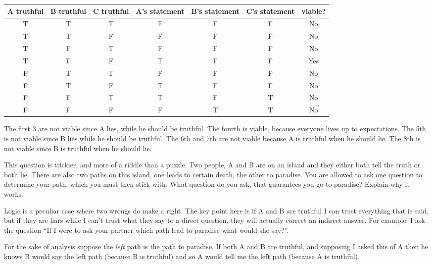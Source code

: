 \documentclass[addpoints, answers]{exam}
\begin{document}
\begin{questions}
\begin{solution}
  {\small
    \begin{tabular}[h]{c@{\,}|c@{\,}|c@{\,}|c@{\,}|c@{\,}|c@{\,}|c@{\,}}
      A truthful & B truthful & C truthful & A's statement & B's statement & C's
      statement & viable?\\
      \hline
      T & T & T & F & F & F & No\\
      T & T & F & F & F & F & No\\
      T & F & T & F & F & F & No\\
      T & F & F & T & F & F & Yes\\
      F & T & T & F & F & F & No\\
      F & T & F & T & F & F & No\\
      F & F & T & T & F & T & No\\
      F & F & F & F & T & T & No\\
    \end{tabular}
  }
  
  The first 3 are not viable since A lies, while he should be truthful. The
  fourth is viable, because everyone lives up to expectations. The 5th is not
  viable since B lies while he should be truthful. The 6th and 7th are not
  viable because A is truthful when he should lie. The 8th is not viable since B
  is truthful when he should lie.
  \end{solution}

  \bonusquestion[5] This question is trickier, and more of a riddle than a
  puzzle. Two people, A and B are on an island and they either both tell the
  truth or both lie. There are also two paths on this island, one leads to
  certain death, the other to paradise. You are allowed to ask one question to
  determine your path, which you must then stick with. What question do you ask,
  that guarantees you go to paradise? Explain why it works.
  \begin{solution}
    Logic is a peculiar case where two wrongs do make a right. The key point
    here is if A and B are truthful I can trust everything that is said, but if
    they are liars while I can't 
    trust what they say to a direct question, they will actually correct an
    indirect answer. For example: I ask the question ``If I were to ask your
    partner which path lead to paradise what would she say?''.

    For the sake of analysis suppose the \emph{left} path is the path to
    paradise. If both A and B are truthful, and supposing I asked this of A then
    he knows B would say the left path (because B is truthful) and so A would
    tell me the left path (because A is truthful). 


\end{solution}
\end{questions}
\end{document}

